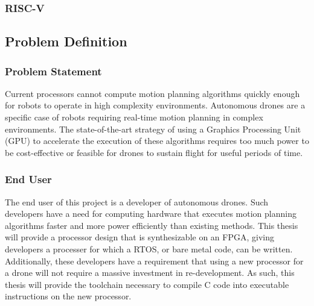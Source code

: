     \subsubsection{RISC-V}



\subsection{Problem Definition}

    \subsubsection*{Problem Statement}
    Current processors cannot compute motion planning algorithms quickly enough for robots to operate in high complexity environments. Autonomous drones are a specific case of robots requiring real-time motion planning in complex environments. The state-of-the-art strategy of using a Graphics Processing Unit (GPU) to accelerate the execution of these algorithms requires too much power to be cost-effective or feasible for drones to sustain flight for useful periods of time.

    \subsubsection*{End User}
    The end user of this project is a developer of autonomous drones. Such developers have a need for computing hardware that executes motion planning algorithms faster and more power efficiently than existing methods. This thesis will provide a processor design that is synthesizable on an \ac{FPGA}, giving developers a processer for which a \ac{RTOS}, or bare metal code, can be written. 
    Additionally, these developers have a requirement that using a new processor for a drone will not require a massive investment in re-development. As such, this thesis will provide the toolchain necessary to compile C code into executable instructions on the new processor.

